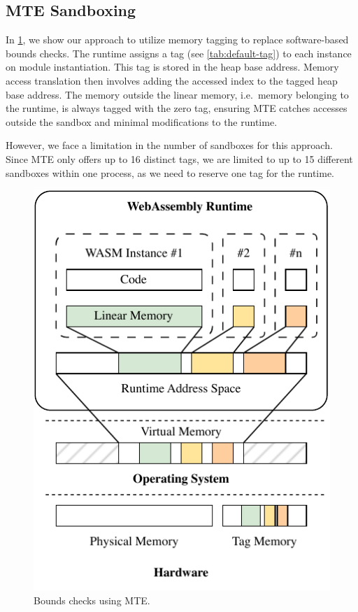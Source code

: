 \subsection{\ac{MTE} Sandboxing}
\label{subsec:bounds-checks}

In \cref{fig:system-design-sandboxing}, we show our approach to utilize memory tagging to replace software-based bounds checks.
The runtime assigns a tag (see \cref{tab:default-tag}) to each instance on module instantiation.
This tag is stored in the heap base address.
Memory access translation then involves adding the accessed index to the tagged heap base address.
The memory outside the linear memory, i.e.\ memory belonging to the runtime, is always tagged with the zero tag, ensuring \ac{MTE} catches accesses outside the sandbox and minimal modifications to the runtime.

However, we face a limitation in the number of sandboxes for this approach.
Since \ac{MTE} only offers up to 16 distinct tags, we are limited to up to 15 different sandboxes within one process, as we need to reserve one tag for the runtime.

\begin{figure}[t]
  \centering
  \includegraphics[scale=1]{figures/build/system-design-1}
  \caption{Bounds checks using \ac{MTE}.}
  \label{fig:system-design-sandboxing}
\end{figure}

